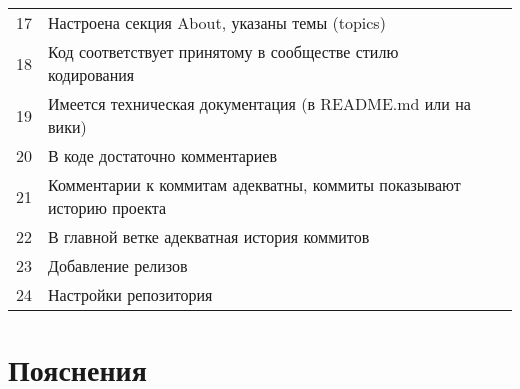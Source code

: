 \documentclass[a5paper]{article}
\begin{document}
\begin{tabu} {| X[0.1 l p] | X[2 l p] | X[0.1 l p] |}
    17 & Настроена секция About, указаны темы (topics)                              & \\
    18 & Код соответствует принятому в сообществе стилю кодирования                 & \\
    19 & Имеется техническая документация (в README.md или на вики)                 & \\
    20 & В коде достаточно комментариев                                             & \\
    21 & Комментарии к коммитам адекватны, коммиты показывают историю проекта       & \\
    22 & В главной ветке адекватная история коммитов                                & \\
    23 & Добавление релизов                                                         & \\
    24 & Настройки репозитория                                                      & \\
\end{tabu}

\section*{Пояснения}
\end{document}
